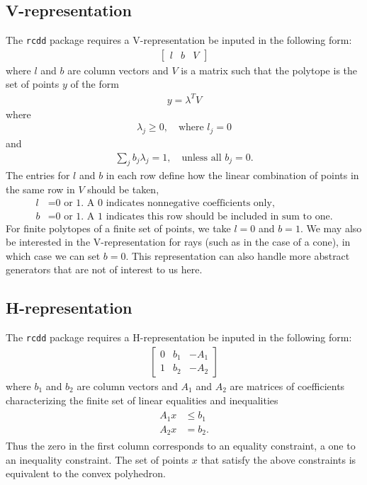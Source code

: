 \subsection{V-representation} \label{S:V-rep}
The \texttt{rcdd} package requires a V-representation be inputed in the following form:
\begin{align} \label{E:V-rep}
	\left[\begin{array}{ccc}l & b & V\end{array}\right]
\end{align}
where $l$ and $b$ are column vectors and $V$ is a matrix such that the polytope
is the set of points $y$ of the form
\begin{align*}
	y = \lambda^T V
\end{align*}
where
\begin{align*}
	\lambda_j \geq 0, \quad \text{where $l_j = 0$}
\end{align*}
and 
\begin{align*}
	\sum_j b_j \lambda_j = 1, \quad \text{unless all $b_j = 0$.}
\end{align*}
The entries for $l$ and $b$ in each row define how the linear combination of 
points in the same row in $V$ should be taken,
\begin{align*}
	l &= \text{0 or 1.  A 0 indicates nonnegative coefficients only,}\\
	b &= \text{0 or 1.  A 1 indicates this row should be included in sum to one.}
\end{align*}
For finite polytopes of a finite set of points, we take $l = 0$ and $b = 1$.  
We may also be interested in the V-representation for rays (such as in the
case of a cone), in which case we can set $b=0$.  
This representation can also handle more abstract generators that 
are not of interest to us here.

\subsection{H-representation} \label{S:H-rep}
The \texttt{rcdd} package requires a H-representation be inputed in the following form:
\begin{align} \label{E:H-rep}
	\left[\begin{array}{ccc}	0 & b_1 & -A_1 \\ 1 & b_2 & -A_2
	\end{array}\right]
\end{align}
where $b_1$ and $b_2$ are column vectors and $A_1$ and $A_2$ are matrices 
of coefficients characterizing the finite set of 
linear equalities and inequalities
\begin{align} \label{E:H-repx}
\begin{split}
	A_1 x &\leq b_1 \\
	A_2 x &= b_2.
\end{split}
\end{align}
Thus the zero in the first column corresponds to an equality constraint, a one to
an inequality constraint.
The set of points $x$ that satisfy the above constraints is equivalent to the
convex polyhedron.


